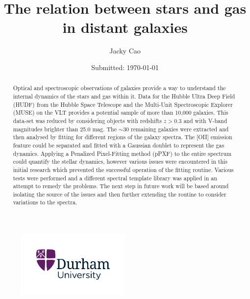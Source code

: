 \documentclass[12pt, twocolumn]{revtex4}    %
\begin{document}
                     

\begin{titlepage}
\title{The relation between stars and gas in distant galaxies} 
\date{Submitted: \today{}}
\author{Jacky Cao}

\begin{abstract}              
Optical and spectroscopic observations of galaxies provide a way to understand the internal dynamics of the stars and gas within it. Data for the Hubble Ultra Deep Field (HUDF) from the Hubble Space Telescope and the Multi-Unit Spectroscopic Explorer (MUSE) on the VLT provides a potential sample of more than 10,000 galaxies. This data-set was reduced by considering objects with redshifts $z>0.3$ and with V-band magnitudes brighter than 25.0 mag. The $\sim30$ remaining galaxies were extracted and then analysed by fitting for different regions of the galaxy spectra. The [OII] emission feature could be separated and fitted with a Gaussian doublet to represent the gas dynamics. Applying a Penalized Pixel-Fitting method (pPXF) to the entire spectrum could quantify the stellar dynamics, however various issues were encountered in this initial research which prevented the successful operation of the fitting routine. Various tests were performed and a different spectral template library was applied in an attempt to remedy the problems. The next step in future work will be based around isolating the source of the issues and then further extending the routine to consider variations to the spectra.
\end{abstract}
\begin{figure}[b]
\centering
\includegraphics[width=0.5\textwidth]{other/durham_university}
\end{figure}
\maketitle
\end{titlepage}
\end{document}
